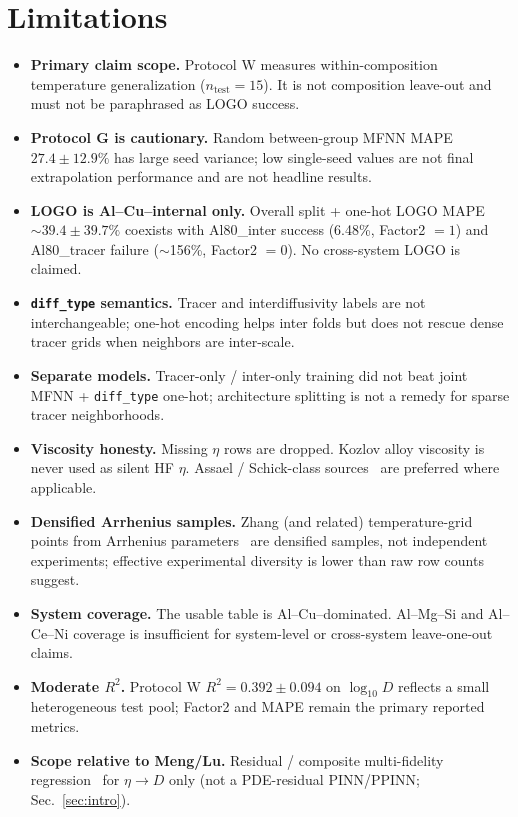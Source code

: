 \documentclass[review,12pt]{elsarticle}
\begin{document}
\section{Limitations}
\label{sec:limitations}

\begin{itemize}
\item \textbf{Primary claim scope.} Protocol W measures within-composition temperature generalization ($n_{\mathrm{test}}=15$). It is not composition leave-out and must not be paraphrased as LOGO success.

\item \textbf{Protocol G is cautionary.} Random between-group MFNN MAPE $27.4\pm 12.9\%$ has large seed variance; low single-seed values are not final extrapolation performance and are not headline results.

\item \textbf{LOGO is Al--Cu--internal only.} Overall split + one-hot LOGO MAPE $\sim 39.4\pm 39.7\%$ coexists with Al80\_inter success (6.48\%, Factor2 $= 1$) and Al80\_tracer failure ($\sim$156\%, Factor2 $= 0$). No cross-system LOGO is claimed.

\item \textbf{\texttt{diff\_type} semantics.} Tracer and interdiffusivity labels are not interchangeable; one-hot encoding helps inter folds but does not rescue dense tracer grids when neighbors are inter-scale.

\item \textbf{Separate models.} Tracer-only / inter-only training did not beat joint MFNN + \texttt{diff\_type} one-hot; architecture splitting is not a remedy for sparse tracer neighborhoods.

\item \textbf{Viscosity honesty.} Missing $\eta$ rows are dropped. Kozlov alloy viscosity is never used as silent HF $\eta$. Assael / Schick-class sources~\cite{assael2006,schick2012} are preferred where applicable.

\item \textbf{Densified Arrhenius samples.} Zhang (and related) temperature-grid points from Arrhenius parameters~\cite{zhang2010prl} are densified samples, not independent experiments; effective experimental diversity is lower than raw row counts suggest.

\item \textbf{System coverage.} The usable table is Al--Cu--dominated. Al--Mg--Si and Al--Ce--Ni coverage is insufficient for system-level or cross-system leave-one-out claims.

\item \textbf{Moderate $R^{2}$.} Protocol W $R^{2}=0.392\pm 0.094$ on $\log_{10} D$ reflects a small heterogeneous test pool; Factor2 and MAPE remain the primary reported metrics.

\item \textbf{Scope relative to Meng/Lu.} Residual / composite multi-fidelity regression~\cite{lu2020pnas,meng2020jcp} for $\eta\to D$ only (not a PDE-residual PINN/PPINN; Sec.~\ref{sec:intro}).
\end{itemize}
\end{document}
